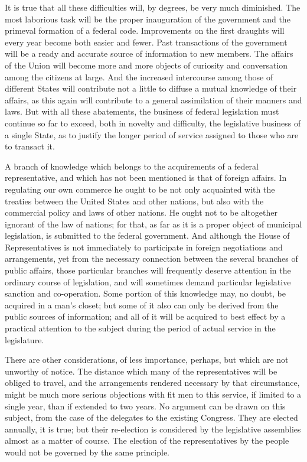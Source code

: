 It is true that all these difficulties will, by degrees, be very much diminished. 
The most laborious task will be the proper inauguration of the government and the primeval formation of a federal code. 
Improvements on the first draughts will every year become both easier and fewer. 
Past transactions of the government will be a ready and accurate source of information to new members. 
The affairs of the Union will become more and more objects of curiosity and conversation among the citizens at large. 
And the increased intercourse among those of different States will contribute not a little to diffuse a mutual knowledge of their affairs, as this again will contribute to a general assimilation of their manners and laws. 
But with all these abatements, the business of federal legislation must continue so far to exceed, both in novelty and difficulty, the legislative business of a single State, as to justify the longer period of service assigned to those who are to transact it.

A branch of knowledge which belongs to the acquirements of a federal representative, and which has not been mentioned is that of foreign affairs. 
In regulating our own commerce he ought to be not only acquainted with the treaties between the United States and other nations, but also with the commercial policy and laws of other nations. 
He ought not to be altogether ignorant of the law of nations; for that, as far as it is a proper object of municipal legislation, is submitted to the federal government. 
And although the House of Representatives is not immediately to participate in foreign negotiations and arrangements, yet from the necessary connection between the several branches of public affairs, those particular branches will frequently deserve attention in the ordinary course of legislation, and will sometimes demand particular legislative sanction and co-operation. 
Some portion of this knowledge may, no doubt, be acquired in a man's closet; but some of it also can only be derived from the public sources of information; and all of it will be acquired to best effect by a practical attention to the subject during the period of actual service in the legislature.

There are other considerations, of less importance, perhaps, but which are not unworthy of notice. 
The distance which many of the representatives will be obliged to travel, and the arrangements rendered necessary by that circumstance, might be much more serious objections with fit men to this service, if limited to a single year, than if extended to two years. 
No argument can be drawn on this subject, from the case of the delegates to the existing Congress. 
They are elected annually, it is true; but their re-election is considered by the legislative assemblies almost as a matter of course. 
The election of the representatives by the people would not be governed by the same principle.

